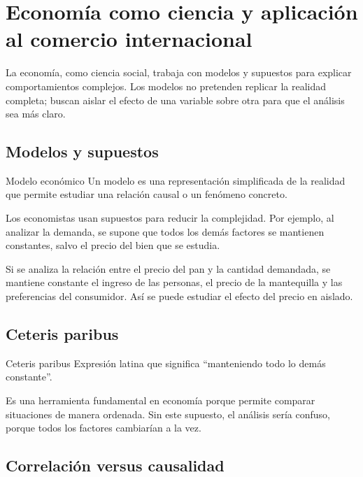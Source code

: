 \section{Economía como ciencia y aplicación al comercio internacional}
\label{sec:economia-ciencia-comercio}

La economía, como ciencia social, trabaja con modelos y supuestos para explicar comportamientos complejos. Los modelos no pretenden replicar la realidad completa; buscan aislar el efecto de una variable sobre otra para que el análisis sea más claro.

\subsection{Modelos y supuestos}

\begin{concepto}{Modelo económico}
Un modelo es una representación simplificada de la realidad que permite estudiar una relación causal o un fenómeno concreto.
\end{concepto}

Los economistas usan supuestos para reducir la complejidad. Por ejemplo, al analizar la demanda, se supone que todos los demás factores se mantienen constantes, salvo el precio del bien que se estudia.

\begin{ejemplo}
Si se analiza la relación entre el precio del pan y la cantidad demandada, se mantiene constante el ingreso de las personas, el precio de la mantequilla y las preferencias del consumidor. Así se puede estudiar el efecto del precio en aislado.
\end{ejemplo}

\subsection{Ceteris paribus}

\begin{concepto}{Ceteris paribus}
Expresión latina que significa “manteniendo todo lo demás constante”.
\end{concepto}

Es una herramienta fundamental en economía porque permite comparar situaciones de manera ordenada. Sin este supuesto, el análisis sería confuso, porque todos los factores cambiarían a la vez.

\subsection{Correlación versus causalidad}

